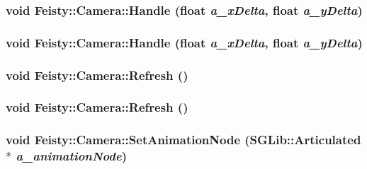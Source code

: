 \label{class_feisty_1_1_camera_aa4384bf9913be09d286fbdf7c318f4f5}
\hypertarget{class_feisty_1_1_camera_a4a05e648973a0cb47c02b09449b4ae13}{
\subsubsection[{Handle}]{\setlength{\rightskip}{0pt plus 5cm}void Feisty::Camera::Handle (float {\em a\_\-xDelta}, \/  float {\em a\_\-yDelta})}}
\label{class_feisty_1_1_camera_a4a05e648973a0cb47c02b09449b4ae13}
\hypertarget{class_feisty_1_1_camera_a4a05e648973a0cb47c02b09449b4ae13}{
\subsubsection[{Handle}]{\setlength{\rightskip}{0pt plus 5cm}void Feisty::Camera::Handle (float {\em a\_\-xDelta}, \/  float {\em a\_\-yDelta})}}
\label{class_feisty_1_1_camera_a4a05e648973a0cb47c02b09449b4ae13}
\hypertarget{class_feisty_1_1_camera_a8729327b8c34fe72d8c6e4964c0d4a6b}{
\subsubsection[{Refresh}]{\setlength{\rightskip}{0pt plus 5cm}void Feisty::Camera::Refresh ()}}
\label{class_feisty_1_1_camera_a8729327b8c34fe72d8c6e4964c0d4a6b}
\hypertarget{class_feisty_1_1_camera_a8729327b8c34fe72d8c6e4964c0d4a6b}{
\subsubsection[{Refresh}]{\setlength{\rightskip}{0pt plus 5cm}void Feisty::Camera::Refresh ()}}
\label{class_feisty_1_1_camera_a8729327b8c34fe72d8c6e4964c0d4a6b}
\hypertarget{class_feisty_1_1_camera_a7aca26cc73f4399edd7ede2ae1914cf8}{
\subsubsection[{SetAnimationNode}]{\setlength{\rightskip}{0pt plus 5cm}void Feisty::Camera::SetAnimationNode (SGLib::Articulated $\ast$ {\em a\_\-animationNode})}}
